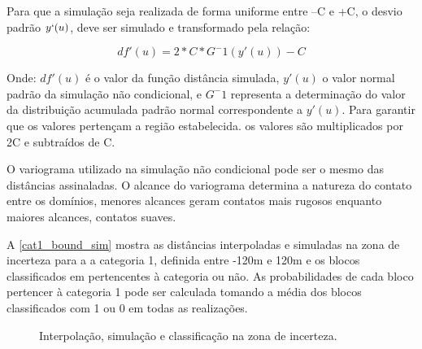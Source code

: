 Para que a simulação seja realizada de forma uniforme entre –C e +C, o desvio padrão $y`(u)$, deve ser simulado e transformado pela relação:

\begin{equation}
    df'(u)=2*C*G^-1(y'(u))-C
\end{equation}

Onde: $df'(u)$ é o valor da função distância simulada, $y'(u)$ o valor normal padrão da simulação não condicional, e $G^-1$ representa a determinação do valor da distribuição acumulada padrão normal correspondente a $y'(u)$. Para garantir que os valores pertençam a região estabelecida. os valores são multiplicados por 2C e subtraídos de C.

O variograma utilizado na simulação não condicional pode ser o mesmo das distâncias assinaladas. O alcance do variograma determina a natureza do contato entre os domínios, menores alcances geram contatos mais rugosos enquanto maiores alcances, contatos suaves.

A \autoref{cat1_bound_sim} mostra as distâncias interpoladas e simuladas na zona de incerteza para a a categoria 1, definida entre -120m e 120m e os blocos classificados em pertencentes à categoria ou não. As probabilidades de cada bloco pertencer à categoria 1 pode ser calculada tomando a média dos blocos classificados com 1 ou 0 em todas as realizações.

\begin{figure} 
    \caption{Interpolação, simulação e classificação na zona de incerteza.} \label{cat1_bound_sim}
     \centering
\end{figure}

